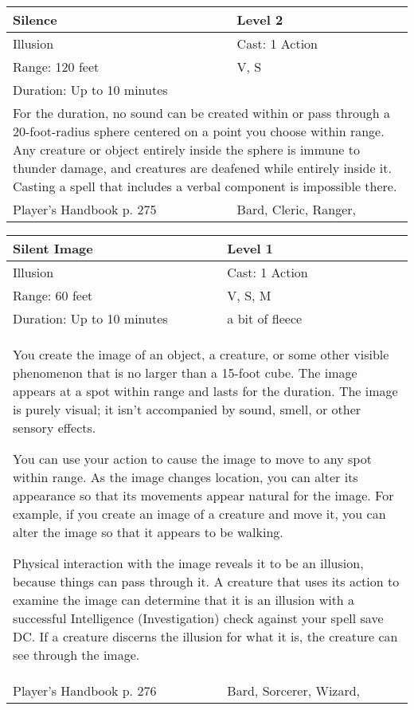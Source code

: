 \documentclass[11pt]{report}
\begin{document}
\begin{table}[H]
	\begin{tabular}{||p{6cm}|p{6cm}||}
		\hline\hline
		\bf{Silence} & Level 2\\ \hline
		Illusion & Cast: 1 Action\\ \hline
		Range: 120 feet & V, S\\ \hline
		Duration: Up to 10 minutes & \\ \hline
		\multicolumn{2}{||p{12cm}||}{For the duration, no sound can be created within or pass through a 20-foot-radius sphere centered on a point you choose within range. Any creature or object entirely inside the sphere is immune to thunder damage, and creatures are deafened while entirely inside it. Casting a spell that includes a verbal component is impossible there.}\\ \hline
Player's Handbook p. 275 & Bard, Cleric, Ranger, \\ \hline\hline
	\end{tabular}
\end{table}

\begin{table}[H]
	\begin{tabular}{||p{6cm}|p{6cm}||}
		\hline\hline
		\bf{Silent Image} & Level 1\\ \hline
		Illusion & Cast: 1 Action\\ \hline
		Range: 60 feet & V, S, M\\ \hline
		Duration: Up to 10 minutes & a bit of fleece\\ \hline
		\multicolumn{2}{||p{12cm}||}{You create the image of an object, a creature, or some other visible phenomenon that is no larger than a 15-foot cube. The image appears at a spot within range and lasts for the duration. The image is purely visual; it isn’t accompanied by sound, smell, or other sensory effects.

You can use your action to cause the image to move to any spot within range. As the image changes location, you can alter its appearance so that its movements appear natural for the image. For example, if you create an image of a creature and move it, you can alter the image so that it appears to be walking.

Physical interaction with the image reveals it to be an illusion, because things can pass through it. A creature that uses its action to examine the image can determine that it is an illusion with a successful Intelligence (Investigation) check against your spell save DC. If a creature discerns the illusion for what it is, the creature can see through the image.}\\ \hline
Player's Handbook p. 276 & Bard, Sorcerer, Wizard, \\ \hline\hline
	\end{tabular}
\end{table}
\end{document}
